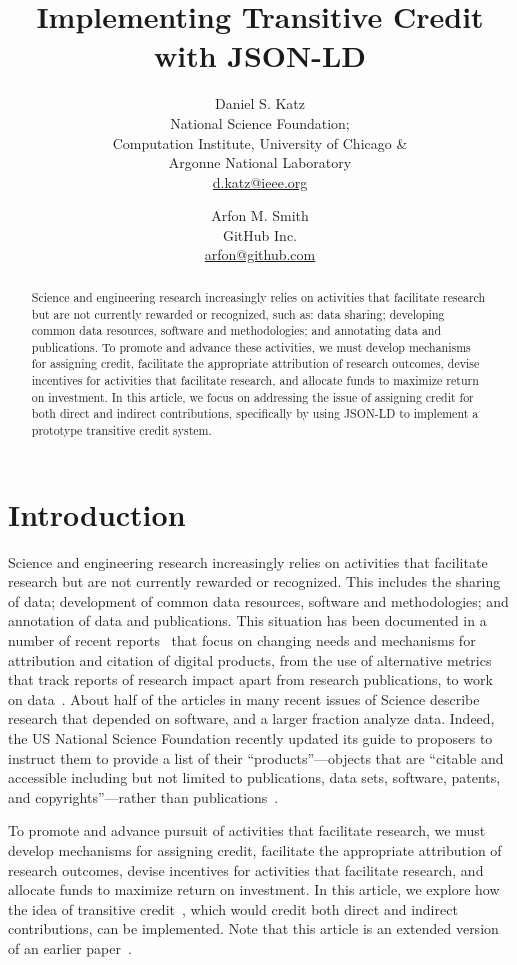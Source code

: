 \documentclass[a4paper,10pt]{article}
\title{Implementing Transitive Credit with JSON-LD}
\author{
Daniel S. Katz\\
National Science Foundation;\\
Computation Institute, University of Chicago \&\\
Argonne National Laboratory\\
\url{d.katz@ieee.org}
\and
Arfon M. Smith\\
GitHub Inc.\\
\url{arfon@github.com}
}
\date{}
\begin{document}
\maketitle

\begin{abstract}

\noindent
Science and engineering research increasingly relies on activities that facilitate research but are not currently rewarded or recognized, such as: data sharing; developing common data resources, software and methodologies; and annotating data and publications.   
To promote and advance these activities, we must develop mechanisms for assigning credit, facilitate the appropriate attribution of research outcomes, devise incentives for activities that facilitate research, and allocate funds to maximize return on investment. In this article, we focus on addressing the issue of assigning credit for both direct and indirect contributions, specifically by using JSON-LD to implement a prototype transitive credit system.
\end{abstract}

\section{Introduction}

Science and engineering research increasingly relies on activities that facilitate research but are not currently rewarded or recognized. This includes the sharing of data; development of common data resources, software and methodologies; and annotation of data and publications. This situation has been documented in a number of recent reports~\cite{NSF_software_vision, WSSSPE1} that focus on changing needs and mechanisms for attribution and citation of digital products, from the use of alternative metrics~\cite{altmetrics} that track reports of research impact apart from research publications, to work on data~\cite{nrc_data}. About half of the articles in many recent issues of Science describe research that depended on software, and a larger fraction analyze data. Indeed, the US National Science Foundation recently updated its guide to proposers to instruct them to provide a list of their ``products''---objects that are ``citable and accessible including but not limited to publications, data sets, software, patents, and copyrights''---rather than publications~\cite{nsf_gpg}.  

To promote and advance pursuit of activities that facilitate research, we must develop mechanisms for assigning credit, facilitate the appropriate attribution of research outcomes, devise incentives for activities that facilitate research, and allocate funds to maximize return on investment. In this article, we explore how the idea of transitive credit~\cite{Katz2_WSSSPE, Katz2_WSSSPE_JORS}, which would credit both direct and indirect contributions, can be implemented. Note that this article is an extended version of an earlier paper~\cite{transitive-wssspe2}. 
\end{document}
